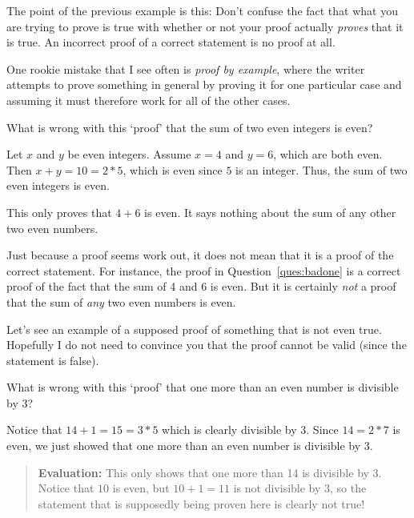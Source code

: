 \begin{rem}
The point of the previous example is this: 
Don't confuse the fact that what you are trying to prove is true with whether or not your proof
actually {\em proves} that it is true.  
An incorrect proof of a correct statement is no proof at all.
\end{rem}

One rookie mistake that I see often is {\em proof by example}, where the writer attempts to prove 
something in general by proving it for one particular case and assuming it must therefore work 
for all of the other cases.

\begin{ques}\label{ques:badone}
 What is wrong with this `proof' that the sum of two even integers is even?
\begin{spf}
Let $x$ and $y$ be even integers.  Assume $x=4$ and $y=6$, which are both even.
Then $x+y=10=2*5$, which is even since $5$ is an integer. 
Thus, the sum of two even integers is even.
\end{spf}
\answerlinetwo
\begin{answer}
This only proves that $4+6$ is even. It says nothing about the sum of any other two even numbers.
\end{answer}
\end{ques}

Just because a proof seems work out, it does not mean that it is a proof of the correct statement. 
For instance, the proof in Question~\ref{ques:badone} is a correct proof of the fact that the sum of 4 and 6 is even. 
But it is certainly {\em not} a proof that the sum of {\em any} two even numbers is even. 

Let's see an example of a supposed proof of something that is not even true.
Hopefully I do not need to convince you that the proof cannot be valid (since the statement is false).

\begin{exa}
 What is wrong with this `proof' that one more than an even number is divisible by 3?
\begin{spf}
Notice that $14+1=15=3*5$ which is clearly divisible by $3$. Since $14=2*7$ is even,
we just showed that one more than an even number is divisible by 3.
\end{spf}
\begin{quote}
{\bf Evaluation:}
This only shows that one more than 14 is divisible by 3. Notice that $10$ is even, but $10+1=11$ is
not divisible by 3, so the statement that is supposedly being proven here is clearly not true!
\end{quote}
\end{exa}

